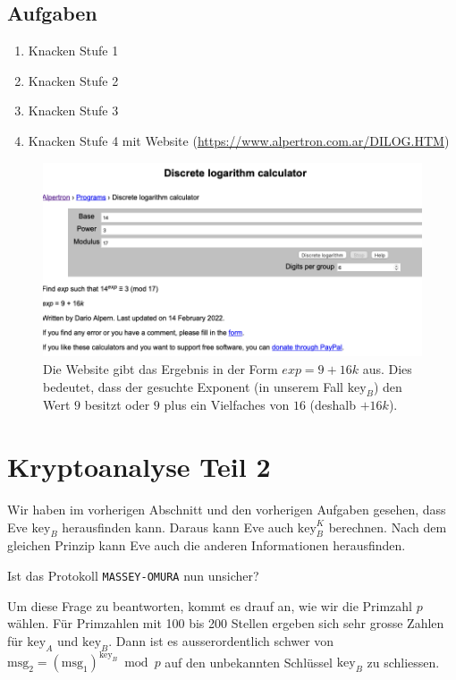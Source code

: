 \subsection{Aufgaben}

\begin{enumerate}
\item Knacken Stufe 1
\item Knacken Stufe 2
\item Knacken Stufe 3
\item Knacken Stufe 4 mit Website (\url{https://www.alpertron.com.ar/DILOG.HTM})
\end{enumerate}

\begin{figure}[htb]
	\includegraphics[scale=0.45]{dlp_solver_website_cut}
	\caption{Die Website gibt das Ergebnis in der Form $exp = 9 + 16k$ aus. Dies bedeutet, dass der gesuchte Exponent (in unserem Fall $\text{key}_B$) den Wert $9$ besitzt oder $9$ plus ein Vielfaches von $16$ (deshalb $+ 16k$).}
	\label{figure-dlp-solver-example}
\end{figure}

\newpage


\section{Kryptoanalyse Teil 2}

Wir haben im vorherigen Abschnitt und den vorherigen Aufgaben gesehen, dass Eve $\text{key}_B$ herausfinden kann. Daraus kann Eve auch $\text{key}_B^K$ berechnen. Nach dem gleichen Prinzip kann Eve auch die anderen Informationen herausfinden.

\begin{center}
	Ist das Protokoll \texttt{MASSEY-OMURA} nun unsicher?
\end{center}

Um diese Frage zu beantworten, kommt es drauf an, wie wir die Primzahl $p$ wählen. Für Primzahlen mit \num{100} bis \num{200} Stellen ergeben sich sehr grosse Zahlen für $\text{key}_A$ und $\text{key}_B$. Dann ist es ausserordentlich schwer von $\text{msg}_2 = (\text{msg}_1)^{\text{key}_B} \bmod p$ auf den unbekannten Schlüssel $\text{key}_B$ zu schliessen. 

